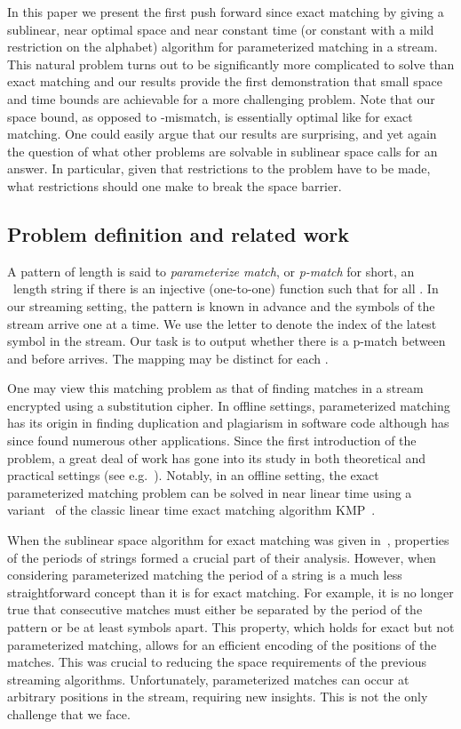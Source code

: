 \documentclass[11pt,a4paper]{article}
\theoremstyle{theorem}
\newcommand{\pmatch}{\mbox{p-match}\xspace}
\begin{document}
In this paper we present the first push forward since exact matching by giving a sublinear, near optimal space and near constant time (or constant with a mild restriction on the alphabet) algorithm for parameterized matching in a stream. This natural problem turns out to be significantly more complicated to solve than exact matching and our results provide the first demonstration that small space and time bounds are achievable for a more challenging problem. Note that our space bound, as opposed to -mismatch, is essentially optimal like for exact matching.
One could easily argue that our results are surprising, and yet again the question of what other problems are solvable in sublinear space calls for an answer. In particular, given that restrictions to the problem have to be made, what restrictions should one make to break the  space barrier.



\subsection{Problem definition and related work}\label{sec:probdef}

A pattern  of length  is said to \emph{parameterize match}, or \emph{\pmatch} for short, an ~length string  if there is an injective (one-to-one) function  such that  for all .
In our streaming setting, the pattern is known in advance and
the symbols of the stream  arrive one at a time.  We use the letter  to denote the index of the latest symbol in the stream. Our task is to output whether there is a \pmatch between  and  before  arrives. The mapping  may be distinct for each .

One may view this matching problem as that of finding matches in a stream encrypted using a substitution cipher. In offline settings, parameterized matching has its origin in finding duplication and plagiarism in software code although has since found numerous
other applications.  Since the first introduction of the problem, a great deal of work has gone into
its study in both theoretical and practical settings (see
e.g.\@~\cite{Baker:1993,AFM:1994,
  Baker:1995,Baker:1996,Baker:1997,HLS:2007}). Notably, in an offline
setting, the exact parameterized matching problem can be solved in
near linear time using a variant~\cite{AFM:1994} of the classic linear
time exact matching algorithm KMP~\cite{Knuth:1977}.

When the sublinear space algorithm for exact matching was given in~\cite{Porat:09},
properties of the periods of strings formed a crucial part of their analysis. However, when considering parameterized matching the period of a string is a much less straightforward concept than it is for exact matching.
For example, it is no longer true that consecutive matches must either be separated by the period of the pattern or be at least  symbols apart. This property, which holds for exact but not parameterized matching, allows for an efficient encoding of the positions of the matches. This was crucial to reducing the space requirements of the previous streaming algorithms.  Unfortunately, parameterized matches can occur at arbitrary positions in the stream, requiring new insights. This is not the only challenge that we face.
\end{document}
